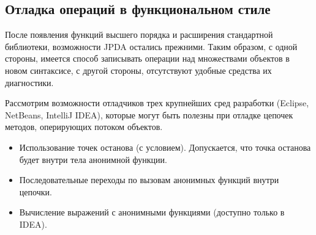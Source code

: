 \subsection{Отладка операций в функциональном стиле}
После появления функций высшего порядка и расширения стандартной библиотеки, возможности JPDA остались прежними. Таким образом, с одной стороны, имеется способ записывать операции над множествами объектов в новом синтаксисе, с другой стороны, отсутствуют удобные средства их диагностики.

Рассмотрим возможности отладчиков трех крупнейших сред разработки (Eclipse, NetBeans, IntelliJ IDEA), которые могут быть полезны при отладке цепочек методов, оперирующих потоком объектов.

\begin{itemize}
	\item Использование точек останова (с условием). Допускается, что точка останова будет внутри тела анонимной функции.
	\item Последовательные переходы по вызовам анонимных функций внутри цепочки.
	\item Вычисление выражений с анонимными функциями (доступно только в IDEA).
\end{itemize}

